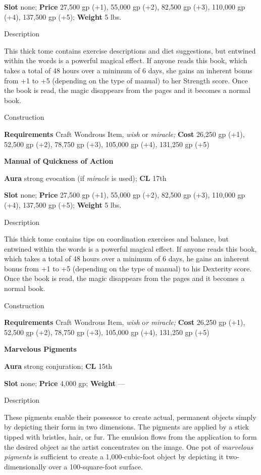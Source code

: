 \textbf{Slot} none; \textbf{Price} 27,500 gp (+1), 55,000 gp (+2), 82,500 gp (+3), 110,000 gp (+4), 137,500 gp (+5); \textbf{Weight} 5 lbs.
				
Description
				
This thick tome contains exercise descriptions and diet suggestions, but entwined within the words is a powerful magical effect. If anyone reads this book, which takes a total of 48 hours over a minimum of 6 days, she gains an inherent bonus from +1 to +5 (depending on the type of manual) to her Strength score. Once the book is read, the magic disappears from the pages and it becomes a normal book. 
				
Construction
				
\textbf{Requirements} Craft Wondrous Item,\textit{ wish }or\textit{ miracle; }\textbf{Cost }26,250 gp (+1), 52,500 gp (+2), 78,750 gp (+3), 105,000 gp (+4), 131,250 gp (+5)
				
\textbf{Manual of Quickness of Action}
				
\textbf{Aura} strong evocation (if \textit{miracle} is used);\textbf{ CL }17th
				
\textbf{Slot} none; \textbf{Price} 27,500 gp (+1), 55,000 gp (+2), 82,500 gp (+3), 110,000 gp (+4), 137,500 gp (+5); \textbf{Weight} 5 lbs.
				
Description
				
This thick tome contains tips on coordination exercises and balance, but entwined within the words is a powerful magical effect. If anyone reads this book, which takes a total of 48 hours over a minimum of 6 days, he gains an inherent bonus from +1 to +5 (depending on the type of manual) to his Dexterity score. Once the book is read, the magic disappears from the pages and it becomes a normal book. 
				
Construction
				
\textbf{Requirements} Craft Wondrous Item,\textit{ wish }o\textit{r miracle; }\textbf{Cost }26,250 gp (+1), 52,500 gp (+2), 78,750 gp (+3), 105,000 gp (+4), 131,250 gp (+5)
				
\textbf{Marvelous Pigments}
				
\textbf{Aura} strong conjuration;\textbf{ CL }15th
				
\textbf{Slot} none; \textbf{Price} 4,000 gp; \textbf{Weight }---
				
Description
				
These pigments enable their possessor to create actual, permanent objects simply by depicting their form in two dimensions. The pigments are applied by a stick tipped with bristles, hair, or fur. The emulsion flows from the application to form the desired object as the artist concentrates on the image. One pot of \textit{marvelous pigments} is sufficient to create a 1,000-cubic-foot object by depicting it two-dimensionally over a 100-square-foot surface. 
				
